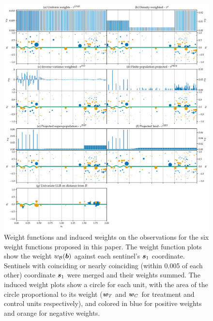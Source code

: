 \begin{figure}[ptb]
\centering
\includegraphics[width=\textwidth]{figures/weight_functions.pdf}
\caption{
	\label{fig:weight_functions}
	Weight functions and induced weights on the observations for the six weight functions proposed in this paper. The weight function plots show the weight \(w_{\mathcal{B}}(\bm{b})\) against each sentinel's \(\bm{s}_1\) coordinate. Sentinels with coinciding or nearly coinciding (within 0.005 of each other) coordinate \(\bm{s}_1\) were merged and their weights summed. The induced weight plots show a circle for each unit, with the area of the circle proportional to its weight (\(\bm{w}_{T}\) and \(\bm{w}_{C}\) for treatment and control units respectively), and colored in blue for positive weights and orange for negative weights.}
\end{figure}


